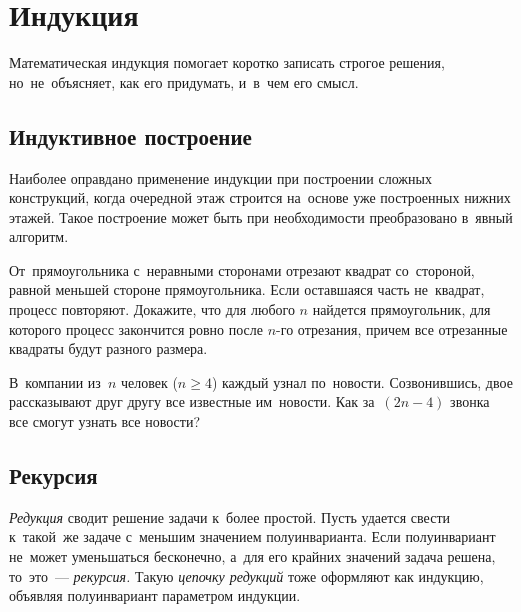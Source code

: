 
\section*{Индукция}



Математическая индукция помогает коротко записать строгое решения,
но~не~объясняет, как его придумать, и~в~чем его смысл.

\subsection*{Индуктивное построение}

Наиболее оправдано применение индукции при построении сложных конструкций,
когда очередной этаж строится на~основе уже построенных нижних этажей.
Такое построение может быть при необходимости преобразовано в~явный алгоритм.

\begin{problems}

\item
От~прямоугольника с~неравными сторонами отрезают квадрат со~стороной, равной
меньшей стороне прямоугольника.
Если оставшаяся часть не~квадрат, процесс повторяют.
Докажите, что для любого $n$ найдется прямоугольник, для которого процесс
закончится ровно после $n$-го отрезания, причем все отрезанные квадраты будут
разного размера.

\item
В~компании из~$n$ человек ($n \geq 4$) каждый узнал по~новости.
Созвонившись, двое рассказывают друг другу все известные им~новости.
Как за~$(2 n - 4)$ звонка все смогут узнать все новости?

\end{problems}

\subsection*{Рекурсия}

\emph{Редукция} сводит решение задачи к~более простой.
Пусть удается свести к~такой~же задаче с~меньшим значением полуинварианта.
Если полуинвариант не~может уменьшаться бесконечно, а~для его крайних значений
задача решена, то~это~--- \emph{рекурсия.}
Такую \emph{цепочку редукций} тоже оформляют как индукцию, объявляя
полуинвариант параметром индукции.

